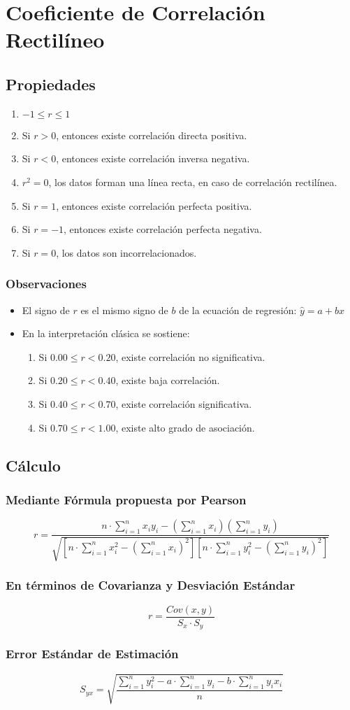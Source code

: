 \section{Coeficiente de Correlación Rectilíneo}
\subsection{Propiedades}
\begin{enumerate}
\item $-1\leq r \leq 1$
\item Si $r>0$, entonces existe correlación directa positiva.
\item Si $r<0$, entonces existe correlación inversa negativa.
\item $r^2=0$, los datos forman una línea recta, en caso de correlación rectilínea.
\item Si $r=1$, entonces existe correlación perfecta positiva.
\item Si $r=-1$, entonces existe correlación perfecta negativa.
\item Si $r=0$, los datos son incorrelacionados.
\end{enumerate}
\subsubsection{Observaciones}
\begin{itemize}
\item El signo de $r$ es el mismo signo de $b$ de la ecuación de regresión: $\hat{y}=a+bx$
\item En la interpretación clásica se sostiene:
\begin{enumerate}
\item Si $0.00 \leq r < 0.20$, existe correlación no significativa.
\item Si $0.20 \leq r < 0.40$, existe baja correlación.
\item Si $0.40 \leq r < 0.70$, existe correlación significativa.
\item Si $0.70 \leq r < 1.00$, existe alto grado de asociación.
\end{enumerate}
\end{itemize}
\subsection{Cálculo}
\subsubsection{Mediante Fórmula propuesta por Pearson}
$$r=
\dfrac{n\cdot \displaystyle\sum_{i=1}^{n}x_i y_i -  \left( \displaystyle\sum_{i=1}^{n}x_i\right) \left( \displaystyle\sum_{i=1}^{n}y_i\right) }
{\sqrt{\left[ n\cdot\displaystyle\sum_{i=1}^{n}x_i^2 - \left( \displaystyle\sum_{i=1}^{n}x_i\right)^2\right]
\left[ n\cdot\displaystyle\sum_{i=1}^{n}y_i^2 - \left( \displaystyle\sum_{i=1}^{n}y_i\right)^2\right]
 }}$$

\subsubsection{En términos de Covarianza y Desviación Estándar}
$$r=\dfrac{Cov(x,y)}{S_x\cdot S_y}$$
\subsubsection{Error Estándar de Estimación}
$$S_{yx}=\sqrt{\dfrac{\displaystyle\sum_{i=1}^{n}y_i^2-a\cdot \displaystyle\sum_{i=1}^{n}y_i-b\cdot\displaystyle\sum_{i=1}^{n}y_i x_i}{n}}$$